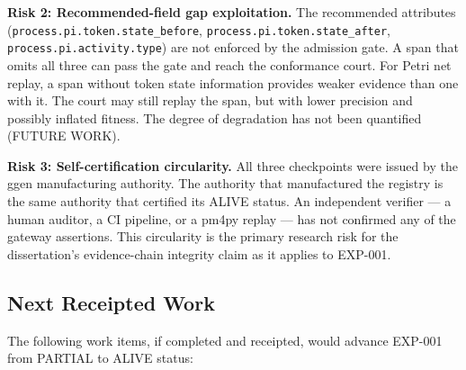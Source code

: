 \textbf{Risk 2: Recommended-field gap exploitation.}
The recommended attributes (\texttt{process.pi.token.state\_before},
\texttt{process.pi.token.state\_after}, \texttt{process.pi.activity.type}) are not enforced
by the admission gate. A span that omits all three can pass the gate and reach the conformance
court. For Petri net replay, a span without token state information provides weaker evidence
than one with it. The court may still replay the span, but with lower precision and possibly
inflated fitness. The degree of degradation has not been quantified (FUTURE WORK).

\textbf{Risk 3: Self-certification circularity.}
All three checkpoints were issued by the ggen manufacturing authority. The authority that
manufactured the registry is the same authority that certified its ALIVE status. An independent
verifier --- a human auditor, a CI pipeline, or a pm4py replay --- has not confirmed any of the
gateway assertions. This circularity is the primary research risk for the dissertation's
evidence-chain integrity claim as it applies to EXP-001.

\subsection{Next Receipted Work}
\label{sec:otel-weaver-exp-001-custom-pi-registry-questions-next}

The following work items, if completed and receipted, would advance EXP-001 from PARTIAL to
ALIVE status:

